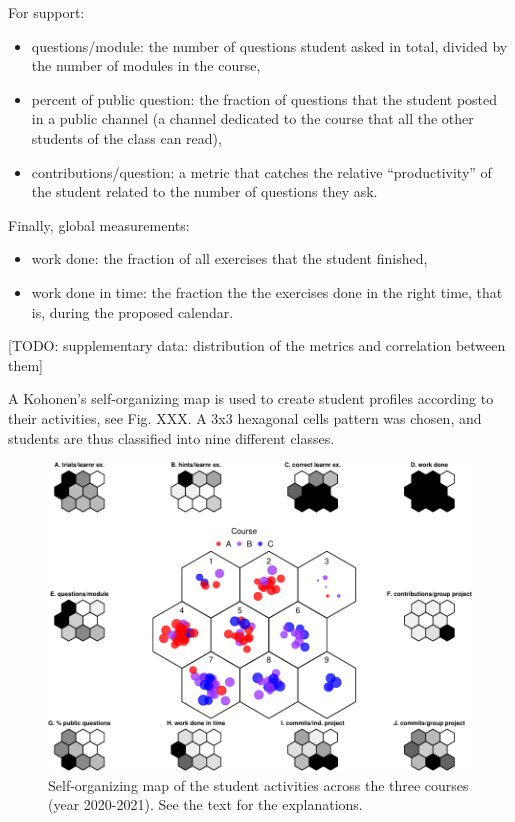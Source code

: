\documentclass[
]{article}
\providecommand{\tightlist}{%
  \setlength{\itemsep}{0pt}\setlength{\parskip}{0pt}}
\begin{document}
For support:

\begin{itemize}
\tightlist
\item
  questions/module: the number of questions student asked in total,
  divided by the number of modules in the course,
\item
  percent of public question: the fraction of questions that the student
  posted in a public channel (a channel dedicated to the course that all
  the other students of the class can read),
\item
  contributions/question: a metric that catches the relative
  ``productivity'' of the student related to the number of questions
  they ask.
\end{itemize}

Finally, global measurements:

\begin{itemize}
\tightlist
\item
  work done: the fraction of all exercises that the student finished,
\item
  work done in time: the fraction the the exercises done in the right
  time, that is, during the proposed calendar.
\end{itemize}

{[}TODO: supplementary data: distribution of the metrics and correlation
between them{]}

A Kohonen's self-organizing map is used to create student profiles
according to their activities, see Fig. XXX. A 3x3 hexagonal cells
pattern was chosen, and students are thus classified into nine different
classes.

\begin{figure}
\centering
\includegraphics{teaching_data_science_files/figure-latex/fig_som-1.pdf}
\caption{Self-organizing map of the student activities across the three
courses (year 2020-2021). See the text for the explanations.}
\end{figure}
\end{document}
